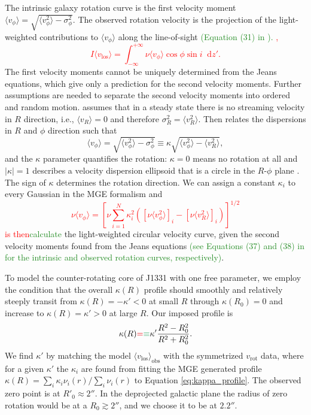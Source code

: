 \documentclass[useAMS,usenatbib]{mnras}
\newcommand*\diff{\mathop{}\!\mathrm{d}}
\newcommand{\NEW}[1]{\textcolor{ForestGreen}{#1}}
\newcommand{\OLD}[1]{\textcolor{Red}{#1}}
\begin{document}
The intrinsic galaxy rotation curve is the first velocity moment $\langle v_\phi\rangle = \sqrt{\langle v_\phi^2 \rangle - \sigma_\phi^2}$. The observed rotation velocity is the projection of the light-weighted contributions to $\langle v_\phi\rangle$ along the line-of-sight \NEW{(Equation (31) in \citep{Cap08}).} \OLD{\citep{Cap08},
\begin{equation*}
I \langle v_\text{los}\rangle = \int_{-\infty}^{+\infty} \nu \langle v_\phi\rangle \cos \phi \sin i \diff z'.
\end{equation*}}
The first velocity moments cannot be uniquely determined from the Jeans equations, which give only a prediction for the second velocity moments. Further assumptions are needed to separate the second velocity moments into ordered and random motion. \citet{Cap08} assumes that in a steady state there is no streaming velocity in $R$ direction, i.e., $\langle v_R \rangle = 0$ and therefore $\sigma_R^2 = \langle v_R^2 \rangle$. Then \citet{Cap08} relates the dispersions in $R$ and $\phi$ direction such that
\begin{equation}
\langle v_\phi\rangle = \sqrt{\langle v_\phi^2 \rangle - \sigma_\phi^2} \equiv \kappa \sqrt{\langle v_\phi^2 \rangle - \langle v_R^2 \rangle},
\end{equation}
and the $\kappa$ parameter quantifies the rotation: $\kappa = 0$ means no rotation at all and $|\kappa| = 1$ describes a velocity dispersion ellipsoid that is a circle in the $R$-$\phi$ plane \citep{Cap08}. The sign of $\kappa$ determines the rotation direction. We can assign a constant $\kappa_i$ to every Gaussian in the MGE formalism and
\OLD{\begin{equation*}
\nu \langle v_\phi\rangle = \left[\nu \sum_{i=1}^N \kappa_i^2 \left( [\nu\langle v_\phi^2 \rangle]_i - [\nu\langle v_R^2 \rangle]_i\right) \right]^{1/2}
\end{equation*} 
is then}\NEW{calculate} the light-weighted circular velocity curve, given the second velocity moments found from the Jeans equations \NEW{(see Equations (37) and (38) in \citet{Cap08} for the intrinsic and observed rotation curves, respectively)}.

To model the counter-rotating core of J1331 with one free parameter, we employ the condition that the overall $\kappa(R)$ profile should smoothly and relatively steeply transit from $\kappa(R) = -\kappa' < 0$ at small $R$ through $\kappa(R_0) = 0$ and increase to $\kappa(R) = \kappa' > 0$ at large $R$. Our imposed profile is
\begin{equation}
\kappa(R) \OLD{=}\NEW{\equiv} \kappa' \frac{R^2 - R_0^2}{R^2 + R_0^2}. \label{eq:kappa_profile}
\end{equation}
We find $\kappa'$ by matching the model $\langle v_\text{los} \rangle_\text{obs}$ with the symmetrized $v_\text{rot}$ data, where for a given $\kappa'$ the $\kappa_i$ are found from fitting the MGE generated profile $\kappa(R) = \sum_i \kappa_i \nu_i(r)/\sum_i \nu_i(r)$ to Equation \eqref{eq:kappa_profile}. The observed zero point is at $R'_0\approx 2''$. In the deprojected galactic plane the radius of zero rotation would be at a $R_0 \gtrsim 2''$, and we choose it to be at $2.2''$.
\end{document}

